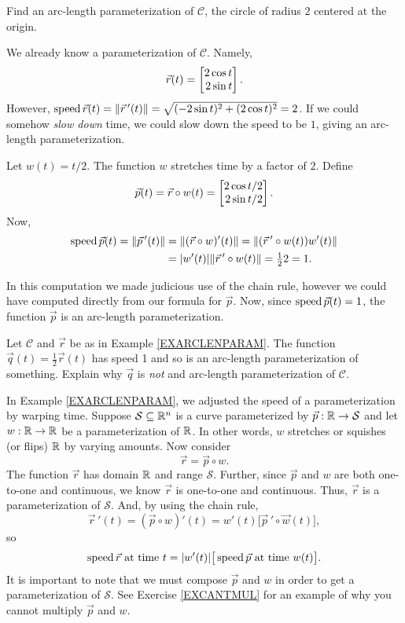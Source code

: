 \begin{example}
	\label{EXARCLENPARAM}
	Find an arc-length parameterization of $\mathcal C$, the circle of radius $2$ centered at the origin.

	We already know a parameterization of $\mathcal C$.  Namely,
	\[
		\vec r(t) =\mat{2\cos t\\2\sin t}.
	\]
	However, $\operatorname{speed} \vec r(t) =\lVert\vec r\,'(t)\rVert = \sqrt{(-2\sin t)^2+(2\cos t)^2} = 2$.  If we could
	somehow \emph{slow down} time, we could slow down the speed to be $1$, giving an arc-length parameterization.

	Let $w(t)=t/2$.  The function $w$ stretches time by a factor of $2$.  Define
	\[
		\vec p(t) = \vec r\circ w(t) = \mat{2\cos t/2\\2\sin t/2}.
	\]
	Now, 
	\begin{align*}
		\operatorname{speed} \vec p(t) = \lVert\vec p\,'(t)\rVert&=\lVert(\vec r\circ w)'(t)\rVert = \lVert(\vec r\,'\circ w(t))w'(t)\rVert\\
		&=\lvert w'(t)\rvert\lVert\vec r\,'\circ w(t)\rVert = \tfrac{1}{2}2=1.
	\end{align*}

	In this computation we made judicious use of the chain rule, however we could have computed
	directly from our formula for $\vec p$.  Now,
	since $\operatorname{speed}\vec p(t)=1$, the function $\vec p$ is an arc-length parameterization.
\end{example}

\begin{exercise}
	\label{EXCANTMUL}
	Let $\mathcal C$ and $\vec r$ be as in Example \ref{EXARCLENPARAM}.  The function $\vec q(t)=\tfrac{1}{2}\vec r(t)$
	has speed 1 and so is an arc-length parameterization of something.  Explain why $\vec q$ is \emph{not}
	and arc-length parameterization of $\mathcal C$.
\end{exercise}

In Example \ref{EXARCLENPARAM}, we adjusted the speed of a parameterization by warping time.  Suppose
$\mathcal S\subseteq \mathbb{R}^n$ is a curve parameterized by $\vec p:\mathbb{R}\to \mathcal S$ and let $w:\mathbb{R}\to\mathbb{R}$ be 
a parameterization of $\mathbb{R}$.  In other words, $w$ stretches or squishes (or flips) $\mathbb{R}$ by varying amounts.
Now consider
\[
	\vec r=\vec p\circ w.
\]
The function $\vec r$ has domain $\mathbb{R}$ and range $\mathcal S$.  Further, since $\vec p$ and $w$ are both
one-to-one and continuous, we know $\vec r$ is one-to-one and continuous.  Thus, $\vec r$ is a parameterization
of $\mathcal S$.  And, by using the chain rule,
\[
	\vec r\,'(t) = (\vec p\circ w)'(t) = w'(t)\big[\vec p\,'\circ \vec w(t)\big],
\]
so
\[
	\operatorname{speed}\vec r\text{ at time $t$} = \lvert w'(t)\rvert\big[\operatorname{speed} \vec p\text{ at time $w(t)$}\big].
\]
It is important to note that we must compose $\vec p$ and $w$ in order to get a parameterization of $\mathcal S$.
See Exercise \ref{EXCANTMUL} for an example of why you cannot multiply $\vec p$ and $w$.

